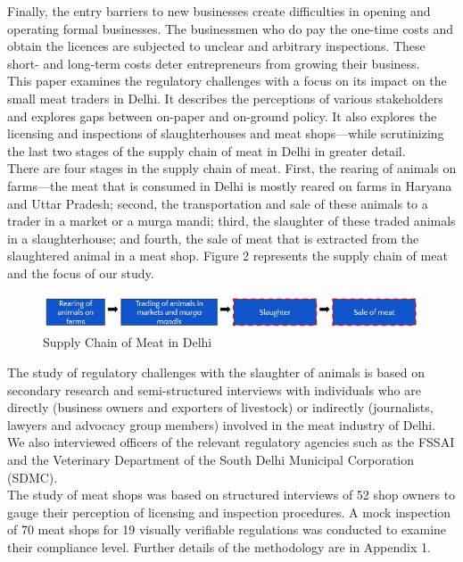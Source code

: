 \documentclass[a4paper, 12pt]{article}
\begin{document}
Finally, the entry barriers to new businesses create difficulties in opening and operating formal businesses. The businessmen who do pay the one-time costs and obtain the licences are subjected to unclear and arbitrary inspections. These short- and long-term costs deter entrepreneurs from growing their business. \\

This paper examines the regulatory challenges with a focus on its impact on the small meat traders in Delhi. It describes the perceptions of various stakeholders and explores gaps between on-paper and on-ground policy. It also explores the licensing and inspections of slaughterhouses and meat shops—while scrutinizing the last two stages of the supply chain of meat in Delhi in greater detail.\\

There are four stages in the supply chain of meat. First, the rearing of animals on farms—the meat that is consumed in Delhi is mostly reared on farms in Haryana and Uttar Pradesh; second, the transportation and sale of these animals to a trader in a market or a murga mandi; third, the slaughter of these traded animals in a slaughterhouse; and fourth, the sale of meat that is extracted from the slaughtered animal in a meat shop. Figure 2 represents the supply chain of meat and the focus of our study. \\

\begin{figure}[H]
\centering
\includegraphics[width=5.5in]{Fig 2.jpg}
\caption{Supply Chain of Meat in Delhi}
\end{figure} 

The study of regulatory challenges with the slaughter of animals is based on secondary research and semi-structured interviews with individuals who are directly (business owners and exporters of livestock) or indirectly (journalists, lawyers and advocacy group members) involved in the meat industry of Delhi. We also interviewed officers of the relevant regulatory agencies such as the FSSAI and the Veterinary Department of the South Delhi Municipal Corporation (SDMC).\\

The study of meat shops was based on structured interviews of 52 shop owners to gauge their perception of licensing and inspection procedures. A mock inspection of 70 meat shops for 19 visually verifiable regulations was conducted to examine their compliance level. Further details of the methodology are in Appendix 1. 
\\
\end{document}

